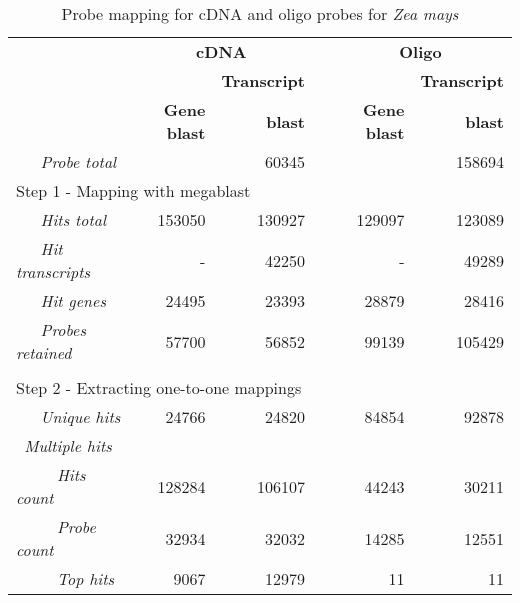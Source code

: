 \begin{table}
	\centering
	\begin{threeparttable}
	\begin{footnotesize}
	\caption{Probe mapping for cDNA and oligo probes for \textit{Zea mays}}
	\label{tab:magic-probemap}
	\begin{tabular}{@{}p{3cm}r|rcr|r}
	\toprule

	& \multicolumn{2}{c}{\textbf{cDNA}} & \phantom{a} & 
	\multicolumn{2}{c}{\textbf{Oligo}} \\
	
	\cmidrule{2-3} \cmidrule{5-6}
	
	& & \textbf{Transcript}	&& & \textbf{Transcript} \\
	& \textbf{Gene blast} & \textbf{blast} && \textbf{Gene blast}	& 
	\textbf{blast} \\
	
	\midrule
	
	{\it ~~~Probe total\tnote{2}} & \multicolumn{2}{r}{60345} &&	
			\multicolumn{2}{r}{158694} \\[1.5ex]

		\multicolumn{6}{l}{Step 1 - Mapping with megablast} \\[.2ex]
	{\it ~~~Hits total\tnote{3}} & 153050 & 130927 && 129097 & 123089 \\
	{\it ~~~Hit transcripts\tnote{4}} & - & 42250 && - & 49289 \\
	{\it ~~~Hit genes\tnote{5}} & 24495 & 23393 && 28879 & 
	28416 \\
	{\it ~~~Probes retained} & 57700 & 56852 && 99139 & 105429 \\
	
	\multicolumn{6}{l}{}\\
		
		\multicolumn{6}{l}{Step 2 - Extracting one-to-one mappings} 
		\\[.2ex]
	{\it ~~~Unique hits\tnote{6}} & 24766 & 24820 && 84854 & 92878 \\
	\multicolumn{6}{l}{{\it ~Multiple hits}} \\
	{\it ~~~~~Hits count\tnote{3}} & 128284 & 106107 && 44243 & 30211 \\
	{\it ~~~~~Probe count} & 32934 & 32032 && 14285 & 12551 \\
	{\it ~~~~~Top hits\tnote{7}} & 9067 & 12979 && 11 & 11 \\
	

\end{tabular}
\end{footnotesize}
\end{threeparttable}
\end{table}
